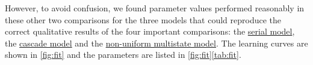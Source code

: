\documentclass[10pt]{article}
\newcounter{tablerow}[table]
\newenvironment{tabularn}[1]{\begin{tabular}{#1>{\refstepcounter{tablerow}}l}}{\end{tabular}}
\newcommand{\dep}{^{\text{dep}}}
\newcommand{\KO}{K$^\mathrm{b}$D$^{\mathrm{b}-/-}$}
\begin{document}
However, to avoid confusion, we found parameter values performed reasonably in these other two comparisons for the three models that could reproduce the correct qualitative results of the four important comparisons: the \hyperref[sec:multistate]{serial model}, the \hyperref[sec:cascade]{cascade model} and the \hyperref[sec:nonuni]{non-uniform multistate model}. The learning curves are shown in \autoref{fig:fit} and the parameters are listed in \autoref{fig:fit}\ref{tab:fit}.


%
\end{document}
